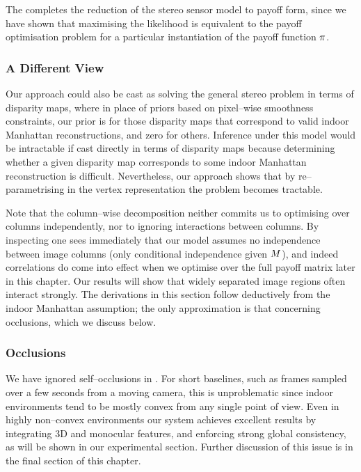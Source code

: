 The completes the reduction of the stereo sensor model to payoff form,
since we have shown that maximising the likelihood
 is equivalent to the payoff optimisation
problem  for a particular instantiation of the payoff
function $\PixelPayoff$.

\subsubsection{A Different View}

Our approach could also be cast as solving the general stereo problem
in terms of disparity maps, where in place of priors based on
pixel--wise smoothness constraints, our prior is 
for those disparity maps that correspond to valid indoor Manhattan
reconstructions, and zero for others. Inference under this model would
be intractable if cast directly in terms of disparity maps because
determining whether a given disparity map corresponds to some indoor
Manhattan reconstruction is difficult. Nevertheless, our approach
shows that by re--parametrising in the vertex representation the
problem becomes tractable.

Note that the column--wise decomposition 
neither commits us to optimising over columns independently, nor to
ignoring interactions between columns. By inspecting
 one sees immediately that our model assumes
no independence between image columns (only conditional independence
given $\Scene$), and indeed correlations do come into effect when we
optimise over the full payoff matrix later in this chapter.  Our
results will show that widely separated image regions often interact
strongly. The derivations in this section follow deductively from the
indoor Manhattan assumption; the only approximation is that concerning
occlusions, which we discuss below.

\subsubsection{Occlusions}

We have ignored self--occlusions in . For
short baselines, such as frames sampled over a few seconds from a
moving camera, this is unproblematic since indoor environments tend to
be mostly convex from any single point of view. Even in highly
non--convex environments our system achieves excellent results by
integrating 3D and monocular features, and enforcing strong global
consistency, as will be shown in our experimental section. Further
discussion of this issue is in the final section of this chapter.

